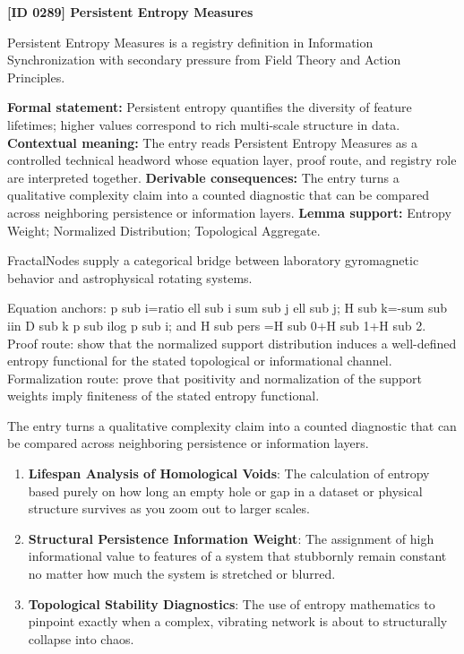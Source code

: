 \clearpage
\noindent\textbf{[ID 0289] Persistent Entropy Measures}\par
\vspace{0.35em}
\begingroup\small
{}
Persistent Entropy Measures is a registry definition in Information Synchronization with secondary pressure from Field Theory and Action Principles.

\begingroup\footnotesize\setlength{\emergencystretch}{3em}\sloppy
\textbf{Formal statement:} Persistent entropy quantifies the diversity of feature lifetimes; higher values correspond to rich multi-scale structure in data. \textbf{Contextual meaning:} The entry reads Persistent Entropy Measures as a controlled technical headword whose equation layer, proof route, and registry role are interpreted together. \textbf{Derivable consequences:} The entry turns a qualitative complexity claim into a counted diagnostic that can be compared across neighboring persistence or information layers. \textbf{Lemma support:} Entropy Weight; Normalized Distribution; Topological Aggregate.\par
\endgroup

FractalNodes supply a categorical bridge between laboratory gyromagnetic behavior and astrophysical rotating systems.

Equation anchors: p sub i=ratio ell sub i sum sub j ell sub j; H sub k=-sum sub iin D sub k p sub ilog p sub i; and H sub pers =H sub 0+H sub 1+H sub 2. Proof route: show that the normalized support distribution induces a well-defined entropy functional for the stated topological or informational channel. Formalization route: prove that positivity and normalization of the support weights imply finiteness of the stated entropy functional.

The entry turns a qualitative complexity claim into a counted diagnostic that can be compared across neighboring persistence or information layers.
\endgroup

\begin{enumerate}[leftmargin=1.6em,itemsep=6pt,topsep=4pt]
\item \textbf{Lifespan Analysis of Homological Voids}: The calculation of entropy based purely on how long an empty hole or gap in a dataset or physical structure survives as you zoom out to larger scales.
\item \textbf{Structural Persistence Information Weight}: The assignment of high informational value to features of a system that stubbornly remain constant no matter how much the system is stretched or blurred.
\item \textbf{Topological Stability Diagnostics}: The use of entropy mathematics to pinpoint exactly when a complex, vibrating network is about to structurally collapse into chaos.
\end{enumerate}

